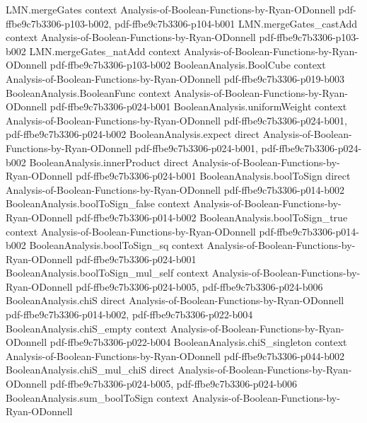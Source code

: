 \begin{lemma}
\proofstep
  {LMN.mergeGates}
  {context}
  {Analysis-of-Boolean-Functions-by-Ryan-ODonnell}
  {pdf-ffbe9c7b3306-p103-b002,
    pdf-ffbe9c7b3306-p104-b001}
\proofstep
  {LMN.mergeGates_castAdd}
  {context}
  {Analysis-of-Boolean-Functions-by-Ryan-ODonnell}
  {pdf-ffbe9c7b3306-p103-b002}
\proofstep
  {LMN.mergeGates_natAdd}
  {context}
  {Analysis-of-Boolean-Functions-by-Ryan-ODonnell}
  {pdf-ffbe9c7b3306-p103-b002}
\proofstep
  {BooleanAnalysis.BoolCube}
  {context}
  {Analysis-of-Boolean-Functions-by-Ryan-ODonnell}
  {pdf-ffbe9c7b3306-p019-b003}
\proofstep
  {BooleanAnalysis.BooleanFunc}
  {context}
  {Analysis-of-Boolean-Functions-by-Ryan-ODonnell}
  {pdf-ffbe9c7b3306-p024-b001}
\proofstep
  {BooleanAnalysis.uniformWeight}
  {context}
  {Analysis-of-Boolean-Functions-by-Ryan-ODonnell}
  {pdf-ffbe9c7b3306-p024-b001,
    pdf-ffbe9c7b3306-p024-b002}
\proofstep
  {BooleanAnalysis.expect}
  {direct}
  {Analysis-of-Boolean-Functions-by-Ryan-ODonnell}
  {pdf-ffbe9c7b3306-p024-b001,
    pdf-ffbe9c7b3306-p024-b002}
\proofstep
  {BooleanAnalysis.innerProduct}
  {direct}
  {Analysis-of-Boolean-Functions-by-Ryan-ODonnell}
  {pdf-ffbe9c7b3306-p024-b001}
\proofstep
  {BooleanAnalysis.boolToSign}
  {direct}
  {Analysis-of-Boolean-Functions-by-Ryan-ODonnell}
  {pdf-ffbe9c7b3306-p014-b002}
\proofstep
  {BooleanAnalysis.boolToSign_false}
  {context}
  {Analysis-of-Boolean-Functions-by-Ryan-ODonnell}
  {pdf-ffbe9c7b3306-p014-b002}
\proofstep
  {BooleanAnalysis.boolToSign_true}
  {context}
  {Analysis-of-Boolean-Functions-by-Ryan-ODonnell}
  {pdf-ffbe9c7b3306-p014-b002}
\proofstep
  {BooleanAnalysis.boolToSign_sq}
  {context}
  {Analysis-of-Boolean-Functions-by-Ryan-ODonnell}
  {pdf-ffbe9c7b3306-p024-b001}
\proofstep
  {BooleanAnalysis.boolToSign_mul_self}
  {context}
  {Analysis-of-Boolean-Functions-by-Ryan-ODonnell}
  {pdf-ffbe9c7b3306-p024-b005,
    pdf-ffbe9c7b3306-p024-b006}
\proofstep
  {BooleanAnalysis.chiS}
  {direct}
  {Analysis-of-Boolean-Functions-by-Ryan-ODonnell}
  {pdf-ffbe9c7b3306-p014-b002,
    pdf-ffbe9c7b3306-p022-b004}
\proofstep
  {BooleanAnalysis.chiS_empty}
  {context}
  {Analysis-of-Boolean-Functions-by-Ryan-ODonnell}
  {pdf-ffbe9c7b3306-p022-b004}
\proofstep
  {BooleanAnalysis.chiS_singleton}
  {context}
  {Analysis-of-Boolean-Functions-by-Ryan-ODonnell}
  {pdf-ffbe9c7b3306-p044-b002}
\proofstep
  {BooleanAnalysis.chiS_mul_chiS}
  {direct}
  {Analysis-of-Boolean-Functions-by-Ryan-ODonnell}
  {pdf-ffbe9c7b3306-p024-b005,
    pdf-ffbe9c7b3306-p024-b006}
\proofstep
  {BooleanAnalysis.sum_boolToSign}
  {context}
  {Analysis-of-Boolean-Functions-by-Ryan-ODonnell}

\end{lemma}
